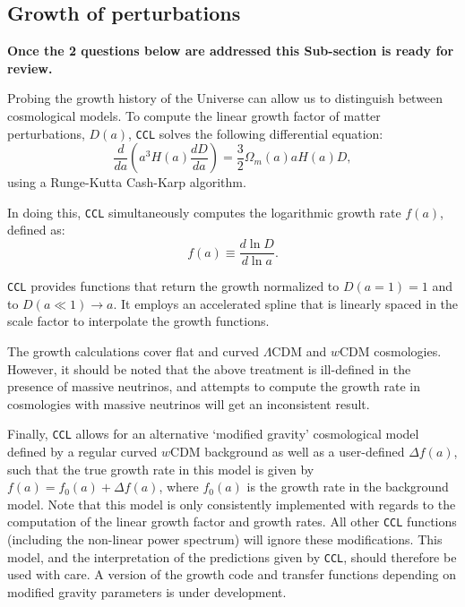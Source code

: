 \documentclass[\docopts]{\docclass}
\newcommand{\ccl}{{\tt CCL}\xspace}
\begin{document}
\subsection{Growth of perturbations}
\label{sec:growth}
{\textcolor{red!55!blue}{\bf Once the 2 questions below are addressed this Sub-section is ready for review.}}


Probing the growth history of the Universe can allow us to distinguish between cosmological models. 
To compute the linear growth factor of matter perturbations, $D(a)$, \ccl solves the following differential equation:
\begin{equation}
  \frac{d}{da}\left(a^3H(a)\frac{dD}{da}\right)=\frac{3}{2}\Omega_m(a)aH(a)D,
  \label{eq:growth}
\end{equation}
using a Runge-Kutta Cash-Karp algorithm. 

In doing this, \ccl simultaneously computes the logarithmic growth rate $f(a)$, defined as:
\begin{equation}
  f(a)\equiv \frac{d\ln D}{d\ln a}.
  \label{eq:lingrowthf}
\end{equation}

\ccl provides functions that return the growth normalized to $D(a=1)=1$ and to $D(a\ll1)\rightarrow a$. It employs an accelerated spline that is linearly spaced in the scale factor to interpolate the growth functions. 

The growth calculations cover flat and curved $\Lambda$CDM and $w$CDM cosmologies. However, it should be noted that the above treatment is ill-defined in the presence of massive neutrinos, and attempts to compute the growth rate in cosmologies with massive neutrinos will get an inconsistent result.

Finally, \ccl allows for an alternative `modified gravity' cosmological model defined by a regular curved $w$CDM background as well as a user-defined $\Delta f(a)$, such that the true growth rate in this model is given by $f(a)=f_0(a)+\Delta f(a)$, where $f_0(a)$ is the growth rate in the background model. Note that this model is only consistently implemented with regards to the computation of the linear growth factor and growth rates.
All other \ccl functions (including the non-linear power spectrum) will ignore these modifications. This model, and the interpretation of the predictions given by \ccl, should therefore be used with care. A version of the growth code and transfer functions depending on modified gravity parameters is under development. 
\end{document}
